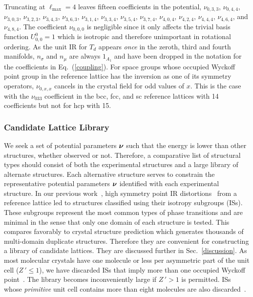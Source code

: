 \documentclass[preprint]{revtex4}
\newcommand{\mb}[1]{\ensuremath{\mbox{\boldmath $ #1 $}}}
\begin{document}
Truncating at $\ell_\mathrm{max}=4$ leaves fifteen coefficients in
the potential, $\nu_{0,3,3}$, $\nu_{0,4,4}$, $\nu_{3,0,3}$,
$\nu_{3,2,3}$, $\nu_{3,4,3}$, $\nu_{3,6,3}$, $\nu_{3,1,4}$,
$\nu_{3,3,4}$, $\nu_{3,5,4}$, $\nu_{3,7,4}$, $\nu_{4,0,4}$,
$\nu_{4,2,4}$, $\nu_{4,4,4}$, $\nu_{4,6,4}$, and $\nu_{4,8,4}$. The
coefficient $\nu_{0,0,0}$ is negligible since it only affects the
trivial basis function $U_{0,0}^0=1$ which is isotropic and
therefore unimportant in rotational ordering.  As the unit IR for
$T_d$ appears \emph{once} in the zeroth, third and fourth manifolds,
$n_\sigma$ and $n_\mu$ are always $1_{A_1}$ and have been dropped in
the notation for the coefficients in Eq.~(\ref{coupling}). For space
groups whose occupied Wyckoff point group in the reference lattice
has the inversion as one of its symmetry operators, $\nu_{0,x,x}$
cancels in the crystal field for odd values of $x$. This is the case
with the $\nu_{033}$ coefficient in the bcc, fcc, and sc reference
lattices with 14 coefficients but not for hcp with
15.

\subsubsection{Candidate Lattice Library}
\label{collection}

We seek a set of potential parameters $\mb{\nu}$ such that the
energy is lower than other structures, whether observed or not.
Therefore, a comparative list of structural types should consist of
both the experimental structures and a large library of alternate
structures. Each alternative structure serves to constrain the
representative potential parameters \mb{\nu} identified with each
experimental structure.  In our previous work~\cite{Mettes04}, high
symmetry point IR distortions~\cite{Stokes88,Stokes02b} from a
reference lattice led to structures classified using their isotropy
subgroups (ISs). These subgroups represent the most common types of
phase transitions and are minimal in the sense that only one domain
of each structure is tested. This compares favorably to crystal
structure prediction which generates thousands of multi-domain
duplicate structures.  Therefore they are convenient for
constructing a library of candidate lattices. They are discussed
further in Sec.~\ref{discussion}.  As most molecular crystals have
one molecule or less per asymmetric part of the unit cell ($Z\,'\leq
1$), we have discarded ISs that imply more than one occupied Wyckoff
point~\cite{Padmaja90}. The library becomes inconveniently large if
$Z\,'> 1$ is permitted. ISs whose \emph{primitive} unit cell
contains more than eight molecules are also
discarded~\cite{Gdanitz97}.
\end{document}
